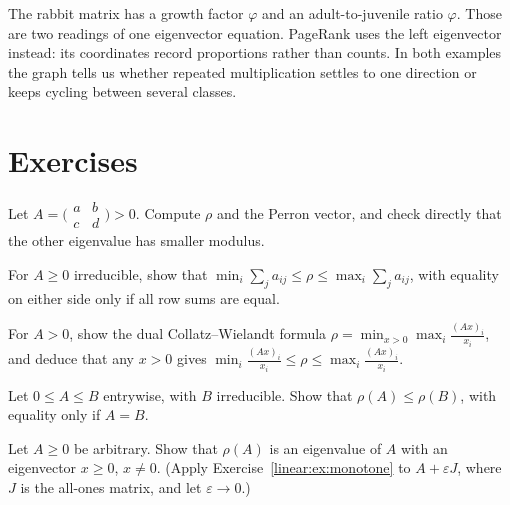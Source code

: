 \begin{beauty}
The rabbit matrix has a growth factor $\varphi$ and an adult-to-juvenile ratio
$\varphi$. Those are two readings of one eigenvector equation. PageRank uses
the left eigenvector instead: its coordinates record proportions rather than
counts. In both examples the graph tells us whether repeated multiplication
settles to one direction or keeps cycling between several classes.
\end{beauty}

\section{Exercises}

\begin{exercise}[$\star$]\label{linear:ex:perron2}
Let $A=\bigl(\begin{smallmatrix}a&b\\c&d\end{smallmatrix}\bigr)>0$. Compute $\rho$ and the Perron vector, and check directly
that the other eigenvalue has smaller modulus.
\end{exercise}

\begin{exercise}[$\star$]\label{linear:ex:rowsum}
For $A\ge0$ irreducible, show that $\min_i\sum_ja_{ij}\le\rho\le\max_i\sum_ja_{ij}$, with equality on either side only if all row
sums are equal.
\end{exercise}

\begin{exercise}[$\star\star$]\label{linear:ex:minmaxcw}
For $A>0$, show the dual Collatz--Wielandt formula $\rho=\min_{x>0}\max_i\frac{(Ax)_i}{x_i}$, and deduce that any $x>0$ gives
$\min_i\frac{(Ax)_i}{x_i}\le\rho\le\max_i\frac{(Ax)_i}{x_i}$.
\end{exercise}

\begin{exercise}[$\star\star$]\label{linear:ex:monotone}
Let $0\le A\le B$ entrywise, with $B$ irreducible. Show that $\rho(A)\le\rho(B)$, with equality only if $A=B$.
\end{exercise}

\begin{exercise}[$\star\star$]\label{linear:ex:nonneg}
Let $A\ge0$ be arbitrary. Show that $\rho(A)$ is an eigenvalue of $A$ with an eigenvector $x\ge0$, $x\ne0$. (Apply
Exercise~\ref{linear:ex:monotone} to $A+\varepsilon J$, where $J$ is the all-ones matrix, and let $\varepsilon\to0$.)
\end{exercise}

